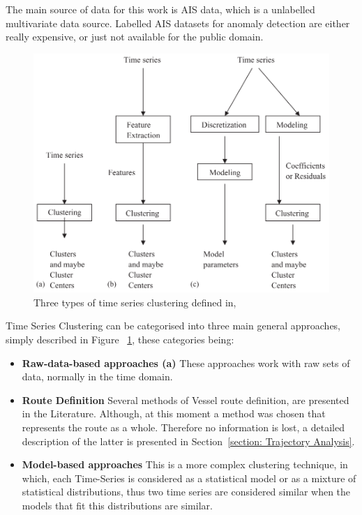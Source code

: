 The main source of data for this work is AIS data, which is a  unlabelled multivariate data source. Labelled AIS datasets for anomaly detection are either really expensive, or just not available for the public domain.  


\begin{figure}[H]
	\centering
	\includegraphics[scale = .6]{figures/TimeSeriesClustering}
    \caption{Three types of time series clustering defined in, ~\cite{WarrenLiao2005}}
    \label{fig:TimeSeriesClustering}
\end{figure}

Time Series Clustering can be categorised into three main general approaches, simply described in Figure ~\ref{fig:TimeSeriesClustering}, these categories being:

\begin{itemize}
\item \textbf{Raw-data-based approaches (a)} These approaches work with raw sets of data, normally in the time domain. 

\item \textbf{Route Definition} Several methods of Vessel route definition, are presented in the Literature.
Although, at this moment a method was chosen that represents the route as a whole. Therefore no information is lost, a detailed description of the latter is presented in Section~\ref{section: Trajectory Analysis}.

\item \textbf{Model-based approaches} This is a more complex clustering technique, in which, each Time-Series is considered as a statistical model or as a mixture of statistical distributions, thus two time series are considered similar when the models that fit this distributions are similar. 
\end{itemize}


